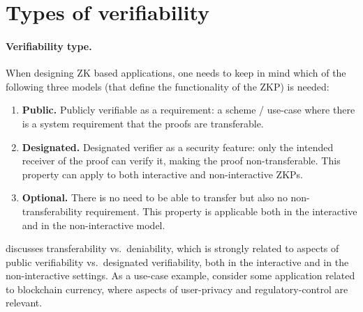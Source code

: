\section{Types of verifiability}   %
\label{apps:scope-use-cases}


\paragraph{Verifiability type.}

When designing ZK based applications, one needs to keep in mind which of the following three models (that define the functionality of the ZKP) is needed:

\begin{enumerate}

    \item \textbf{Public.}
		Publicly verifiable as a requirement: a scheme / use-case where 
	there is a system requirement that the proofs are transferable. %

		
    \item \textbf{Designated.} 
		Designated verifier as a security feature: only the intended receiver of the proof can verify it, making the proof non-transferable. 
		This property can apply to both interactive and non-interactive ZKPs.

		
    \item \textbf{Optional.} %
		There is no need to be able to transfer but also no non-transferability requirement. %
		This property is applicable both in the interactive and in the non-interactive model.

\end{enumerate}


	 discusses transferability vs.\ deniability, %
which is strongly related to aspects of public verifiability vs.\ designated verifiability,
both in the interactive and in the non-interactive settings.
	As a use-case example, consider some application related to blockchain currency, where aspects of user-privacy and regulatory-control are relevant.
	
